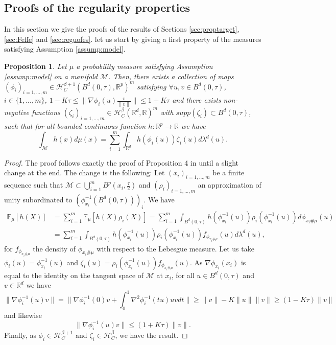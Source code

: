 \documentclass[10pt]{article}
\newtheorem{proposition}{Proposition}
\begin{document}
\subsection{Proofs of  the regularity properties}
In this section we give the proofs of the results of Sections \ref{sec:proptarget}, \ref{sec:Feffe} and  \ref{sec:reguofes}. let us start by giving a first property of the measures satisfying Assumption \ref{assump:model}.
\begin{proposition}\label{prop:keydecompunedeplus}
    Let $\mu$ a probability measure satisfying Assumption \ref{assump:model} on a manifold $\mathcal{M}$. Then, there exists  a collection of maps $(\phi_i)_{i=1,...,m}\in\mathcal{H}^{\beta+1}_{C}(B^d(0,\tau),\mathbb{R}^p)^m$ satisfying $\forall u,v\in B^d(0,\tau)$, $i\in \{1,...,m\}$, 
    $1-K\tau\leq \|\nabla \phi_i(u)\frac{v}{\|v\|}\|\leq 1+K\tau$ and there exists non-negative functions $(\zeta_i)_{i=1,...,m}\in\mathcal{H}^{\beta}_{C}(\mathbb{R}^d,\mathbb{R})^m$ with $supp(\zeta_i)\subset B^d(0,\tau)$, such that for all bounded continuous function $h:\mathbb{R}^p\rightarrow \mathbb{R}$ we have 
    \begin{equation*}
        \int_\mathcal{M} h(x)d\mu(x)= \sum \limits_{i=1}^m \int_{\mathbb{R}^d}h(\phi_i(u))\zeta_i(u)d\lambda^d(u).
    \end{equation*}
\end{proposition}

\begin{proof}
    The proof follows exactly the proof of Proposition 4 in \cite{stephanovitch2024ipm} until a slight change at the end. The change is the following:
    Let $(x_i)_{i=1,...,m}$ be a finite sequence such that $\mathcal{M}\subset \bigcup \limits_{i=1}^m B^p(x_i,\frac{\tau}{2})$ and $(\rho_i)_{i=1,...,m}$ an approximation of unity subordinated to $(\phi_{x_i}^{-1}(B^d(0,\tau)))_i$. We have 
    \begin{align*}
        \mathbb{E}_{\mu}[h(X)] & =\sum \limits_{i=1}^m\mathbb{E}_{\mu}[h(X)\rho_i(X)]=\sum \limits_{i=1}^m\int_{B^d(0,\tau)}h(\phi_{x_i}^{-1}(u))\rho_i(\phi_{x_i}^{-1}(u))d\phi_{x_i\# \mu}(u)\\
        & =\sum \limits_{i=1}^m\int_{B^d(0,\tau)}h(\phi_{x_i}^{-1}(u))\rho_i(\phi_{x_i}^{-1}(u))f_{\phi_{x_i\# \mu}}(u)d\lambda^d(u),
    \end{align*}
    for $f_{\phi_{x_i\# \mu}}$ the density of $\phi_{x_i\# \mu}$ with respect to the Lebesgue measure. Let us take $\phi_i(u)=\phi_{x_i}^{-1}(u)$ and $\zeta_i(u)=\rho_i(\phi_{x_i}^{-1}(u))f_{\phi_{x_i\# \mu}}(u)$. As $\nabla \phi_{x_i}(x_i)$ is equal to the identity on the tangent space of $\mathcal{M}$ at $x_i$, for all $u\in B^d(0,\tau)$ and $v\in \mathbb{R}^d$ we have 
$$\|\nabla \phi_i^{-1}(u)v\|=\|\nabla \phi_i^{-1}(0)v+\int_0^1 \nabla^2 \phi_i^{-1}(tu)uvdt\|\geq \|v\|-K\|u\| \|v\|\geq (1-K\tau)\|v\|$$
and likewise 
$$\|\nabla \phi_i^{-1}(u)v\|\leq (1+K\tau)\|v\|.$$
Finally, as $\phi_i\in \mathcal{H}^{\beta+1}_C$ and $\zeta_i\in \mathcal{H}^{\beta}_C$, we have the result.
\end{proof}
\end{document}
